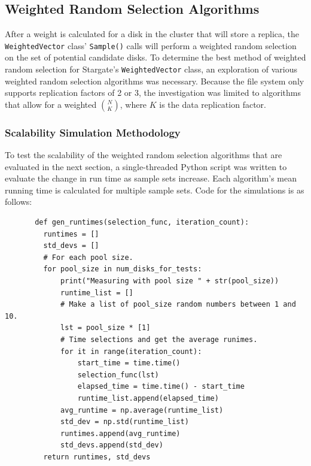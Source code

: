 \documentclass[12pt]{article}
\begin{document}
  \subsection{Weighted Random Selection Algorithms}

  After a weight is calculated for a disk in the cluster that will store a
  replica, the \texttt{WeightedVector} class' \texttt{Sample()} calls will
  perform a weighted random selection on the set of potential candidate disks.
  To determine the best method of weighted random selection for Stargate's
  \texttt{WeightedVector} class, an exploration of various weighted random
  selection algorithms was necessary.  Because the file system only supports
  replication factors of 2 or 3, the investigation was limited to algorithms
  that allow for a weighted $\binom{N}{K}$, where $K$ is the data replication
  factor.

    \subsubsection{Scalability Simulation Methodology}
     To test the scalability of the weighted random selection algorithms that
     are evaluated in the next section, a single-threaded Python \cite{python}
     script was written to evaluate the change in run time as sample sets
     increase. Each algorithm's mean running time is calculated for multiple
     sample sets. Code for the simulations is as follows:

     \singlespace
     \begin{tcolorbox}
     \begin{verbatim}
       def gen_runtimes(selection_func, iteration_count):
         runtimes = []
         std_devs = []
         # For each pool size.
         for pool_size in num_disks_for_tests:
             print("Measuring with pool size " + str(pool_size))
             runtime_list = []
             # Make a list of pool_size random numbers between 1 and 10.
             lst = pool_size * [1]
             # Time selections and get the average runimes.
             for it in range(iteration_count):
                 start_time = time.time()
                 selection_func(lst)
                 elapsed_time = time.time() - start_time
                 runtime_list.append(elapsed_time)
             avg_runtime = np.average(runtime_list)
             std_dev = np.std(runtime_list)
             runtimes.append(avg_runtime)
             std_devs.append(std_dev)
         return runtimes, std_devs
     \end{verbatim}
     \end{tcolorbox}
     \doublespace
        
\end{document}
